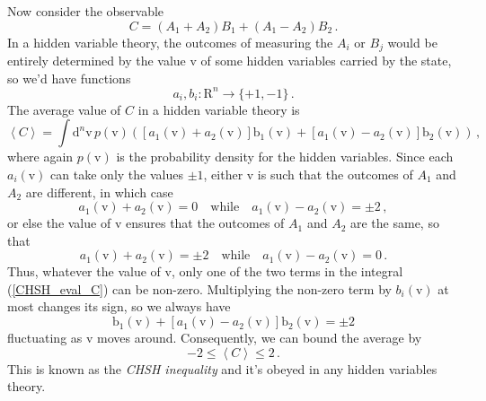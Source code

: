 \documentclass{article}
\theoremstyle{plain}\theoremheaderfont{\normalfont\itshape}\theorembodyfont{\rmfamily}\theoremseparator{.}\newtheorem*{rem}{Remark}\newtheorem*{ex}{Example}\newtheorem*{proof}{Proof}\newtheorem*{altp}{Alternative proof}
\theoremstyle{plain}\theoremheaderfont{\normalfont\bfseries}\theorembodyfont{\rmfamily}\theoremseparator{.}\newtheorem{thm}{Theorem}[section]\newtheorem{lem}[thm]{Lemma}\newtheorem{prop}[thm]{Proposition}\newtheorem*{cor}{Corollary}\newtheorem{defn}[thm]{Definition}\newtheorem{clm}[thm]{Claim}\newtheorem{clminproof}{Claim}
\theoremstyle{break}\theoremheaderfont{\normalfont\itshape}\theorembodyfont{\rmfamily}\theoremseparator{.\medskip}\newtheorem*{proofskip}{Proof}\newtheorem*{exs}{Examples}\newtheorem*{rems}{Remarks}
\theoremstyle{break}\theoremheaderfont{\normalfont\bfseries}\theorembodyfont{\rmfamily}\theoremseparator{.\medskip}\newtheorem{lemskip}[thm]{Lemma}\newtheorem{defnskip}[thm]{Definition}\newtheorem{propskip}[thm]{Proposition}\newtheorem{thmskip}[thm]{Theorem}
\numberwithin{equation}{section}
\newcommand{\dd}[2][]{\mathrm{d}^{#1} #2\,}
\newcommand{\eval}[1]{\left\langle #1 \right\rangle}
\newcommand{\vb}[1]{\bm{\mathrm{#1}}}
\begin{document}
    Now consider the observable
    \begin{equation}
        C=(A_1+A_2)B_1+(A_1-A_2)B_2\,.
    \end{equation}
    In a hidden variable theory, the outcomes of measuring the \(A_i\) or \(B_j\) would be entirely determined by the value \(\vb{v}\) of some hidden variables carried by the state, so we'd have functions
    \begin{equation}
        a_i,b_i:\vb{R}^n\longrightarrow\{+1,-1\}\,.
    \end{equation}
    The average value of \(C\) in a hidden variable theory is
    \begin{equation}\label{CHSH_eval_C}
        \eval{C}=\int\dd[n]{\vb{v}}p(\vb{v})\left([a_1(\vb{v})+a_2(\vb{v})]\vb{b}_1(\vb{v})+[a_1(\vb{v})-a_2(\vb{v})]\vb{b}_2(\vb{v})\right)\,,
    \end{equation}
    where again \(p(\vb{v})\) is the probability density for the hidden variables. Since each \(a_i(\vb{v})\) can take only the values \(\pm 1\), either \(\vb{v}\) is such that the outcomes of \(A_1\) and \(A_2\) are different, in which case
    \begin{equation}
        a_1(\vb{v})+a_2(\vb{v})=0\quad\text{while}\quad a_1(\vb{v})-a_2(\vb{v})=\pm 2\,,
    \end{equation}
    or else the value of \(\vb{v}\) ensures that the outcomes of \(A_1\) and \(A_2\) are the same, so that
    \begin{equation}
        a_1(\vb{v})+a_2(\vb{v})=\pm 2\quad\text{while}\quad a_1(\vb{v})-a_2(\vb{v})=0\,.
    \end{equation}
    Thus, whatever the value of \(\vb{v}\), only one of the two terms in the integral (\ref{CHSH_eval_C}) can be non-zero. Multiplying the non-zero term by \(b_i(\vb{v})\) at most changes its sign, so we always have
    \begin{equation}
        [a_1(\vb{v})+a_2(\vb{v})]\vb{b}_1(\vb{v})+[a_1(\vb{v})-a_2(\vb{v})]\vb{b}_2(\vb{v})=\pm 2
    \end{equation}
    fluctuating as \(\vb{v}\) moves around. Consequently, we can bound the average by
    \begin{equation}\label{CHSH_bound}
        -2\le\eval{C}\le 2\,.
    \end{equation}
    This is known as the \textit{CHSH inequality} and it's obeyed in any hidden variables theory.
\end{document}
